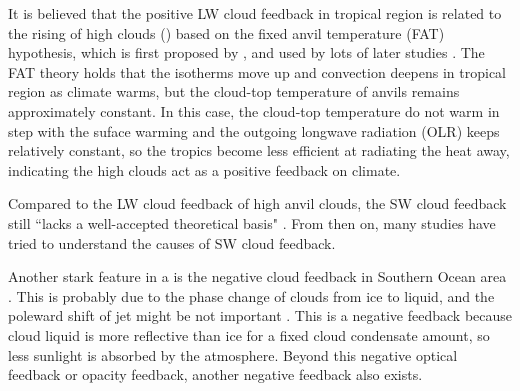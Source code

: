 It is believed that the positive LW cloud feedback in tropical region is related to the rising of high clouds () based on the fixed anvil temperature (FAT) hypothesis, which is first proposed by \cite{Hartmann2002FAT}, and used by lots of later studies \cite[e.g.,][]{Kuang2007,Zelinka2010longwave,Yoshimori2020fixed}. The FAT theory holds that the isotherms move up and convection deepens in tropical region as climate warms, but the cloud-top temperature of anvils remains approximately constant. In this case, the cloud-top temperature do not warm in step with the suface warming and the outgoing longwave radiation (OLR) keeps relatively constant, so the tropics become less efficient at radiating the heat away, indicating the high clouds act as a positive feedback on climate.


Compared to the LW cloud feedback of high anvil clouds, the SW cloud feedback still ``lacks a well-accepted theoretical basis" \citep{Stocker2013}. From then on, many studies have tried to understand the causes of SW cloud feedback. 

Another stark feature in a is the negative cloud feedback in Southern Ocean area \citep[Figure 8 of ][]{Vial2013,Zelinka2012computing}. This is probably due to the phase change of clouds from ice to liquid, and the poleward shift of jet might be not important \citep{Kay2014processes}. This is a negative feedback because cloud liquid is more reflective than ice for a fixed cloud condensate amount, so less sunlight is absorbed by the atmosphere. Beyond this negative optical feedback or opacity feedback, another negative feedback also exists.

